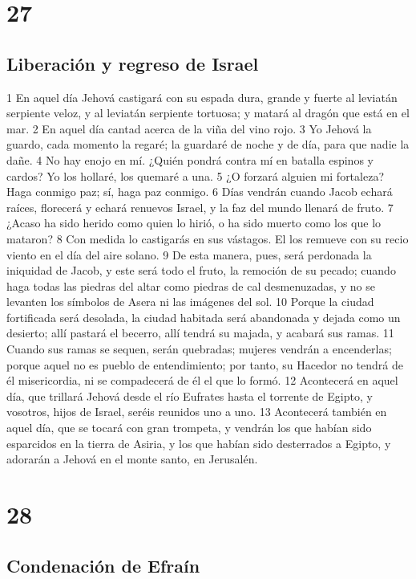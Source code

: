 \chapter{27}

\section*{Liberación y regreso de Israel}

1 En aquel día Jehová castigará con su espada dura, grande y fuerte al leviatán serpiente veloz, y al leviatán serpiente tortuosa; y matará al dragón que está en el mar.
2 En aquel día cantad acerca de la viña del vino rojo.
3 Yo Jehová la guardo, cada momento la regaré; la guardaré de noche y de día, para que nadie la dañe.
4 No hay enojo en mí. ¿Quién pondrá contra mí en batalla espinos y cardos? Yo los hollaré, los quemaré a una.
5 ¿O forzará alguien mi fortaleza? Haga conmigo paz; sí, haga paz conmigo.
6 Días vendrán cuando Jacob echará raíces, florecerá y echará renuevos Israel, y la faz del mundo llenará de fruto.
7 ¿Acaso ha sido herido como quien lo hirió, o ha sido muerto como los que lo mataron?
8 Con medida lo castigarás en sus vástagos. El los remueve con su recio viento en el día del aire solano.
9 De esta manera, pues, será perdonada la iniquidad de Jacob, y este será todo el fruto, la remoción de su pecado; cuando haga todas las piedras del altar como piedras de cal desmenuzadas, y no se levanten los símbolos de Asera ni las imágenes del sol.
10 Porque la ciudad fortificada será desolada, la ciudad habitada será abandonada y dejada como un desierto; allí pastará el becerro, allí tendrá su majada, y acabará sus ramas.
11 Cuando sus ramas se sequen, serán quebradas; mujeres vendrán a encenderlas; porque aquel no es pueblo de entendimiento; por tanto, su Hacedor no tendrá de él misericordia, ni se compadecerá de él el que lo formó.
12 Acontecerá en aquel día, que trillará Jehová desde el río Eufrates hasta el torrente de Egipto, y vosotros, hijos de Israel, seréis reunidos uno a uno.
13 Acontecerá también en aquel día, que se tocará con gran trompeta, y vendrán los que habían sido esparcidos en la tierra de Asiria, y los que habían sido desterrados a Egipto, y adorarán a Jehová en el monte santo, en Jerusalén.

\chapter{28}

\section*{Condenación de Efraín}

